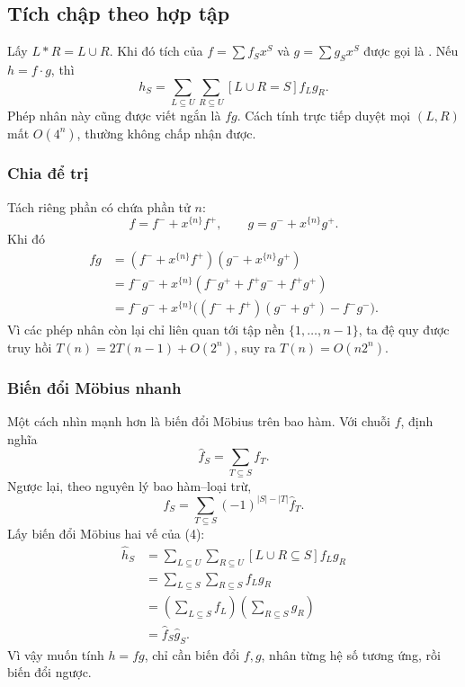 \documentclass[11pt]{article}
\begin{document}
\subsection{Tích chập theo hợp tập}

Lấy \(L*R=L\cup R\). Khi đó tích của \(f=\sum f_Sx^S\) và \(g=\sum g_Sx^S\)
được gọi là . Nếu \(h=f\cdot g\), thì
\[
  h_S=\sum_{L\subseteq U}\sum_{R\subseteq U}
       [L\cup R=S] f_Lg_R. \tag{4}
\]
Phép nhân này cũng được viết ngắn là \(fg\). Cách tính trực tiếp duyệt mọi
\((L,R)\) mất \(O(4^n)\), thường không chấp nhận được.

\subsubsection{Chia để trị}

Tách riêng phần có chứa phần tử \(n\):
\[
  f=f^-+x^{\{n\}}f^+,\qquad g=g^-+x^{\{n\}}g^+.
\]
Khi đó
\begin{align*}
  fg
  &= (f^-+x^{\{n\}}f^+)(g^-+x^{\{n\}}g^+) \tag{5}\\
  &= f^-g^-+x^{\{n\}}(f^-g^+ + f^+g^- + f^+g^+) \tag{6}\\
  &= f^-g^-+x^{\{n\}}\bigl((f^-+f^+)(g^-+g^+) - f^-g^-\bigr). \tag{7}
\end{align*}
Vì các phép nhân còn lại chỉ liên quan tới tập nền \(\{1,\ldots,n-1\}\), ta đệ
quy được truy hồi \(T(n)=2T(n-1)+O(2^n)\), suy ra \(T(n)=O(n2^n)\).

\subsubsection{Biến đổi Möbius nhanh}

Một cách nhìn mạnh hơn là biến đổi Möbius trên bao hàm. Với chuỗi \(f\), định
nghĩa
\[
  \hat f_S=\sum_{T\subseteq S} f_T. \tag{8}
\]
Ngược lại, theo nguyên lý bao hàm--loại trừ,
\[
  f_S=\sum_{T\subseteq S}(-1)^{|S|-|T|}\hat f_T. \tag{9}
\]
Lấy biến đổi Möbius hai vế của (4):
\begin{align*}
  \hat h_S
  &= \sum_{L\subseteq U}\sum_{R\subseteq U}
     [L\cup R\subseteq S] f_Lg_R \tag{10}\\
  &= \sum_{L\subseteq S}\sum_{R\subseteq S} f_Lg_R \tag{11}\\
  &= \left(\sum_{L\subseteq S}f_L\right)
     \left(\sum_{R\subseteq S}g_R\right) \tag{12}\\
  &= \hat f_S\hat g_S. \tag{13}
\end{align*}
Vì vậy muốn tính \(h=fg\), chỉ cần biến đổi \(f,g\), nhân từng hệ số tương ứng,
rồi biến đổi ngược.
\end{document}
